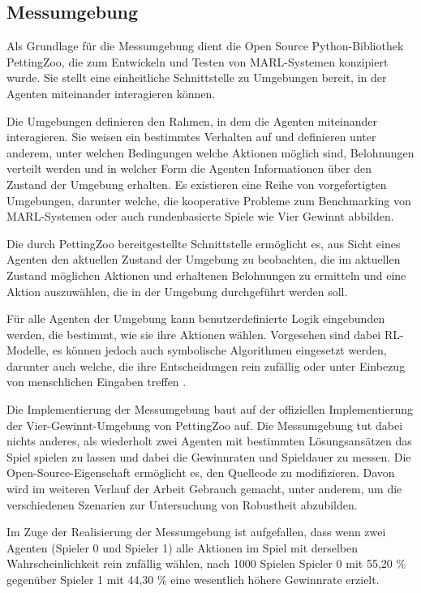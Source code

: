 \subsection{Messumgebung}


Als Grundlage für die Messumgebung dient die Open Source Python-Bibliothek PettingZoo, die zum Entwickeln und Testen von MARL-Systemen konzipiert wurde. Sie stellt eine einheitliche Schnittstelle zu Umgebungen bereit, in der Agenten miteinander interagieren können.

Die Umgebungen definieren den Rahmen, in dem die Agenten miteinander interagieren. Sie weisen ein bestimmtes Verhalten auf und definieren unter anderem, unter welchen Bedingungen welche Aktionen möglich sind, Belohnungen verteilt werden und in welcher Form die Agenten Informationen über den Zustand der Umgebung erhalten. Es existieren eine Reihe von vorgefertigten Umgebungen, darunter welche, die kooperative Probleme zum Benchmarking von MARL-Systemen oder auch rundenbasierte Spiele wie Vier Gewinnt abbilden.

Die durch PettingZoo bereitgestellte Schnittstelle ermöglicht es, aus Sicht eines Agenten den aktuellen Zustand der Umgebung zu beobachten, die im aktuellen Zustand möglichen Aktionen und erhaltenen Belohnungen zu ermitteln und eine Aktion auszuwählen, die in der Umgebung durchgeführt werden soll.

Für alle Agenten der Umgebung kann benutzerdefinierte Logik eingebunden werden, die bestimmt, wie sie ihre Aktionen wählen. Vorgesehen sind dabei RL-Modelle, es können jedoch auch symbolische Algorithmen eingesetzt werden, darunter auch welche, die ihre Entscheidungen rein zufällig oder unter Einbezug von menschlichen Eingaben treffen \cite{Farama.2025}.


Die Implementierung der Messumgebung baut auf der offiziellen Implementierung der Vier-Gewinnt-Umgebung von PettingZoo auf. Die Messumgebung tut dabei nichts anderes, als wiederholt zwei Agenten mit bestimmten Lösungsansätzen das Spiel spielen zu lassen und dabei die Gewinnraten und Spieldauer zu messen. Die Open-Source-Eigenschaft ermöglicht es, den Quellcode zu modifizieren. Davon wird im weiteren Verlauf der Arbeit Gebrauch gemacht, unter anderem, um die verschiedenen Szenarien zur Untersuchung von Robustheit abzubilden.

Im Zuge der Realisierung der Messumgebung ist aufgefallen, dass wenn zwei Agenten (Spieler 0 und Spieler 1) alle Aktionen im Spiel mit derselben Wahrscheinlichkeit rein zufällig wählen, nach 1000 Spielen Spieler 0 mit 55,20 \% gegenüber Spieler 1 mit 44,30 \% eine wesentlich höhere Gewinnrate erzielt.

